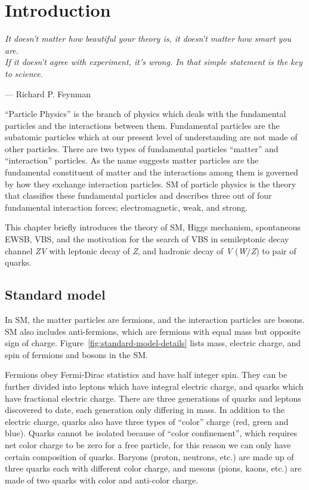 \chapter{
  Introduction
 }\label{ch_intro}

\epigraph{\textit{It doesn't matter how beautiful your theory is,
    it doesn't matter how smart you are. \\
    If it doesn't agree with experiment, it's wrong.
    In that simple statement is the key to science.}}
{--- Richard P. Feynman}

``Particle Physics'' is the branch of physics which deals with the fundamental
particles and the interactions between them. Fundamental particles are the
subatomic particles which at our present level of understanding
are not made of other particles.
There are two types of fundamental particles ``matter'' and ``interaction''
particles. As the name suggests matter particles are the fundamental constituent
of matter and the interactions among them is governed by how they exchange interaction particles.
\gls{SM} of particle physics is the theory that classifies these fundamental
particles and describes three out of four fundamental
interaction forces; electromagnetic, weak, and strong.

This chapter briefly introduces the theory of \gls{SM}, Higgs mechanism,
spontaneous \gls{EWSB}, \gls{VBS}, and the motivation for the search of \gls{VBS}
in semileptonic decay channel \textit{ZV} with leptonic decay of \textit{Z},
and hadronic decay of \textit{V} (\textit{W}/\textit{Z}) to pair of quarks.

\section{
  Standard model
 }\label{ch_intro:standard-model}

In \gls{SM}, the matter particles are fermions, and
the interaction particles are bosons. \gls{SM} also includes
anti-fermions, which are fermions with equal mass but opposite sign of charge.
Figure~\ref{fig:standard-model-details} lists mass, electric charge,
and spin of fermions and bosons in the \gls{SM}.

Fermions obey Fermi-Dirac statistics and have half integer spin. They can be further
divided into leptons which have integral electric charge, and quarks which have
fractional electric charge. There are three generations of quarks and leptons
discovered to date, each generation only differing in mass.
In addition to the electric charge, quarks also have
three types of ``color'' charge (red, green and blue). Quarks cannot be isolated
because of ``color confinement'', which requires net color charge to be zero
for a free particle, for this reason we can only have certain composition
of quarks. Baryons (proton, neutrons, etc.) are made up of three quarks
each with different color charge,
and mesons (pions, kaons, etc.) are made of two quarks with color and anti-color charge.

